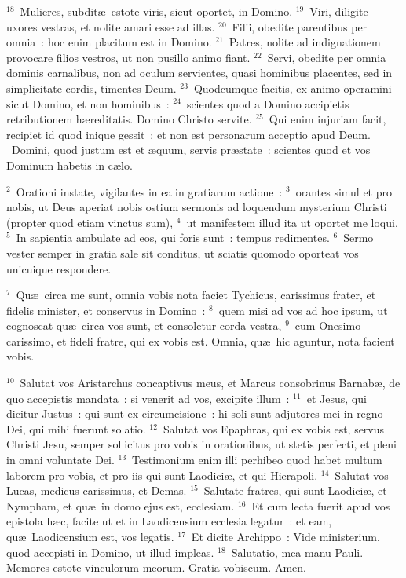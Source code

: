 ${}^{18}$~Mulieres, subdit\ae\ estote viris, sicut oportet, in Domino.
${}^{19}$~Viri, diligite uxores vestras, et nolite amari esse ad illas.
${}^{20}$~Filii, obedite parentibus per omnia~: hoc enim placitum est in Domino.
${}^{21}$~Patres, nolite ad indignationem provocare filios vestros, ut non pusillo animo fiant.
${}^{22}$~Servi, obedite per omnia dominis carnalibus, non ad oculum servientes, quasi hominibus placentes, sed in simplicitate cordis, timentes Deum.
${}^{23}$~Quodcumque facitis, ex animo operamini sicut Domino, et non hominibus~:
${}^{24}$~scientes quod a Domino accipietis retributionem h\ae reditatis. Domino Christo servite.
${}^{25}$~Qui enim injuriam facit, recipiet id quod inique gessit~: et non est personarum acceptio apud Deum.
~\lettrine[lines=10,image=true,loversize=0.05,lraise=-0.03]{D}{}omini, quod justum est et \ae quum, servis pr\ae state~: scientes quod et vos Dominum habetis in c\ae lo.


${}^{2}$~Orationi instate, vigilantes in ea in gratiarum actione~:
${}^{3}$~orantes simul et pro nobis, ut Deus aperiat nobis ostium sermonis ad loquendum mysterium Christi (propter quod etiam vinctus sum),
${}^{4}$~ut manifestem illud ita ut oportet me loqui.
${}^{5}$~In sapientia ambulate ad eos, qui foris sunt~: tempus redimentes.
${}^{6}$~Sermo vester semper in gratia sale sit conditus, ut sciatis quomodo oporteat vos unicuique respondere.


${}^{7}$~Qu\ae\ circa me sunt, omnia vobis nota faciet Tychicus, carissimus frater, et fidelis minister, et conservus in Domino~:
${}^{8}$~quem misi ad vos ad hoc ipsum, ut cognoscat qu\ae\ circa vos sunt, et consoletur corda vestra,
${}^{9}$~cum Onesimo carissimo, et fideli fratre, qui ex vobis est. Omnia, qu\ae\ hic aguntur, nota facient vobis.


${}^{10}$~Salutat vos Aristarchus concaptivus meus, et Marcus consobrinus Barnab\ae , de quo accepistis mandata~: si venerit ad vos, excipite illum~:
${}^{11}$~et Jesus, qui dicitur Justus~: qui sunt ex circumcisione~: hi soli sunt adjutores mei in regno Dei, qui mihi fuerunt solatio.
${}^{12}$~Salutat vos Epaphras, qui ex vobis est, servus Christi Jesu, semper sollicitus pro vobis in orationibus, ut stetis perfecti, et pleni in omni voluntate Dei.
${}^{13}$~Testimonium enim illi perhibeo quod habet multum laborem pro vobis, et pro iis qui sunt Laodici\ae , et qui Hierapoli.
${}^{14}$~Salutat vos Lucas, medicus carissimus, et Demas.
${}^{15}$~Salutate fratres, qui sunt Laodici\ae , et Nympham, et qu\ae\ in domo ejus est, ecclesiam.
${}^{16}$~Et cum lecta fuerit apud vos epistola h\ae c, facite ut et in Laodicensium ecclesia legatur~: et eam, qu\ae\ Laodicensium est, vos legatis.
${}^{17}$~Et dicite Archippo~: Vide ministerium, quod accepisti in Domino, ut illud impleas.
${}^{18}$~Salutatio, mea manu Pauli. Memores estote vinculorum meorum. Gratia vobiscum. Amen.
